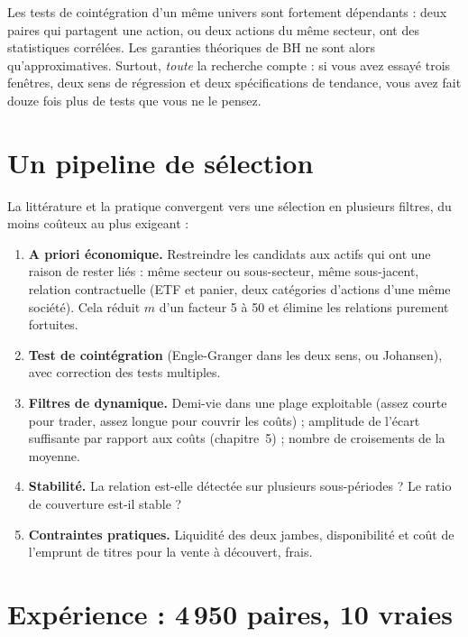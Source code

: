 \begin{pitfall}
Les tests de cointégration d'un même univers sont fortement dépendants : deux paires qui partagent une action, ou deux actions du même secteur, ont des statistiques corrélées. Les garanties théoriques de BH ne sont alors qu'approximatives. Surtout, \emph{toute} la recherche compte : si vous avez essayé trois fenêtres, deux sens de régression et deux spécifications de tendance, vous avez fait douze fois plus de tests que vous ne le pensez.
\end{pitfall}

\section{Un pipeline de sélection}

La littérature et la pratique convergent vers une sélection en plusieurs filtres, du moins coûteux au plus exigeant :
\begin{enumerate}
\item \textbf{A priori économique.} Restreindre les candidats aux actifs qui ont une raison de rester liés : même secteur ou sous-secteur, même sous-jacent, relation contractuelle (ETF et panier, deux catégories d'actions d'une même société). Cela réduit $m$ d'un facteur 5 à 50 et élimine les relations purement fortuites.
\item \textbf{Test de cointégration} (Engle-Granger dans les deux sens, ou Johansen), avec correction des tests multiples.
\item \textbf{Filtres de dynamique.} Demi-vie dans une plage exploitable (assez courte pour trader, assez longue pour couvrir les coûts) ; amplitude de l'écart suffisante par rapport aux coûts (chapitre~5) ; nombre de croisements de la moyenne.
\item \textbf{Stabilité.} La relation est-elle détectée sur plusieurs sous-périodes ? Le ratio de couverture est-il stable ?
\item \textbf{Contraintes pratiques.} Liquidité des deux jambes, disponibilité et coût de l'emprunt de titres pour la vente à découvert, frais.
\end{enumerate}

\section{Expérience : 4\,950 paires, 10 vraies}

